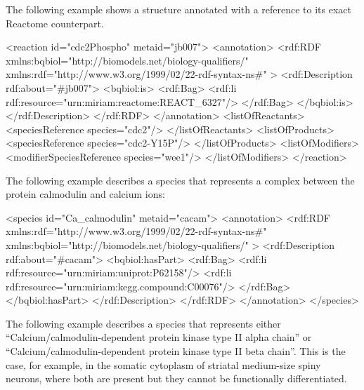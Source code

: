 The following example shows a \Reaction structure annotated
with a reference to its exact Reactome counterpart.

\begin{blockChanged}
\begin{example}
<reaction id="cdc2Phospho" metaid="jb007">
  <annotation>
    <rdf:RDF
      xmlns:bqbiol="http://biomodels.net/biology-qualifiers/"
      xmlns:rdf="http://www.w3.org/1999/02/22-rdf-syntax-ns\#"
    >
      <rdf:Description rdf:about="#jb007">
        <bqbiol:is>
          <rdf:Bag>
            <rdf:li rdf:resource="urn:miriam:reactome:REACT_6327"/>
          </rdf:Bag>
        </bqbiol:is>
      </rdf:Description>
    </rdf:RDF>
  </annotation>
  <listOfReactants>
    <speciesReference species="cdc2"/>
  </listOfReactants>
  <listOfProducts>
    <speciesReference species="cdc2-Y15P"/>
  </listOfProducts>
  <listOfModifiers>
    <modifierSpeciesReference species="wee1"/>
  </listOfModifiers>
</reaction>
\end{example}
\end{blockChanged}

The following example describes a species that represents a
complex between the protein calmodulin and calcium ions:

\begin{blockChanged}
\begin{example}
<species id="Ca_calmodulin" metaid="cacam">
  <annotation>
    <rdf:RDF
      xmlns:rdf="http://www.w3.org/1999/02/22-rdf-syntax-ns\#"
      xmlns:bqbiol="http://biomodels.net/biology-qualifiers/"
    >
      <rdf:Description rdf:about="\#cacam">
        <bqbiol:hasPart>
          <rdf:Bag>
            <rdf:li rdf:resource="urn:miriam:uniprot:P62158"/>
            <rdf:li rdf:resource="urn:miriam:kegg.compound:C00076"/>
          </rdf:Bag>
        </bqbiol:hasPart>
      </rdf:Description>
    </rdf:RDF>
  </annotation>
</species>
\end{example}
\end{blockChanged}

The following example describes a species that represents either
``Calcium/calmodulin-dependent protein kinase type II alpha
chain'' or ``Calcium/calmodulin-dependent protein kinase type II
beta chain''. This is the case, for example, in the somatic
cytoplasm of striatal medium-size spiny neurons, where both are
present but they cannot be functionally differentiated.

